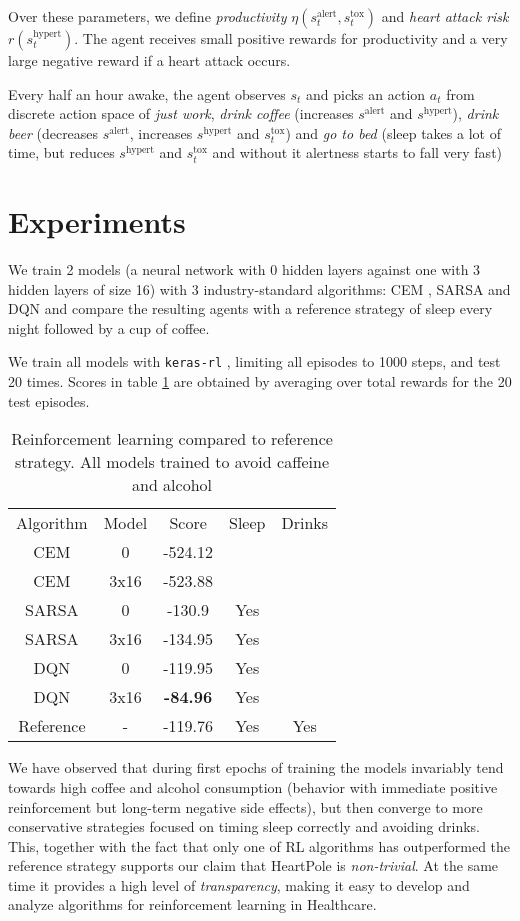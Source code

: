Over these parameters, we define \emph{productivity} $\eta(s^\text{alert}_t, s^\text{tox}_t)$ and \emph{heart attack risk} $r(s^\text{hypert}_t)$.
The agent receives small positive rewards for productivity and a very large negative reward if a heart attack occurs.

Every half an hour awake, the agent observes $s_t$ and picks an action $a_t$ from discrete action space of \emph{just work}, \emph{drink coffee} (increases $s^\text{alert}$ and $s^\text{hypert}$), \emph{drink beer} (decreases $s^\text{alert}$, increases $s^\text{hypert}$ and $s^\text{tox}_t$) and \emph{go to bed} (sleep takes a lot of time, but reduces $s^\text{hypert}$ and $s^\text{tox}_t$ and without it alertness starts to fall very fast)

\section{Experiments}
\label{sec:heartpole-experiments}

We train 2 models (a neural network with 0 hidden layers against one with 3 hidden layers of size 16) with 3 industry-standard algorithms: CEM \cite{cem}, SARSA \cite[Chapter 6]{thebook} and DQN \cite{dqn1,dqn2} and compare the resulting agents with a reference strategy of sleep every night followed by a cup of coffee.

We train all models with \texttt{keras-rl} \cite{kerasrl}, limiting all episodes to 1000 steps, and test 20 times.
Scores in table \ref{tab:heartpole-results} are obtained by averaging over total rewards for the 20 test episodes.

\begin{table}[]
    \centering
    \begin{tabular}{c|c|c|c|c}
         Algorithm & Model & Score & Sleep & Drinks \\
         CEM & 0 & -524.12 &  &   \\
         CEM & 3x16 & -523.88 & & \\
         SARSA & 0 & -130.9 & Yes & \\
         SARSA & 3x16 & -134.95 & Yes & \\
         DQN & 0 & -119.95 & Yes &  \\
         DQN & 3x16 & \textbf{-84.96} & Yes &  \\
         Reference & - & -119.76 & Yes & Yes 
    \end{tabular}
    \caption{Reinforcement learning compared to reference strategy. All models trained to avoid caffeine and alcohol}
    \label{tab:heartpole-results}
\end{table}

We have observed that during first epochs of training the models invariably tend towards high coffee and alcohol consumption (behavior with immediate positive reinforcement but long-term negative side effects), but then converge to more conservative strategies focused on timing sleep correctly and avoiding drinks. 
This, together with the fact that only one of RL algorithms has outperformed the reference strategy supports our claim that HeartPole is \emph{non-trivial}.
At the same time it provides a high level of \emph{transparency}, making it easy to develop and analyze algorithms for reinforcement learning in Healthcare.